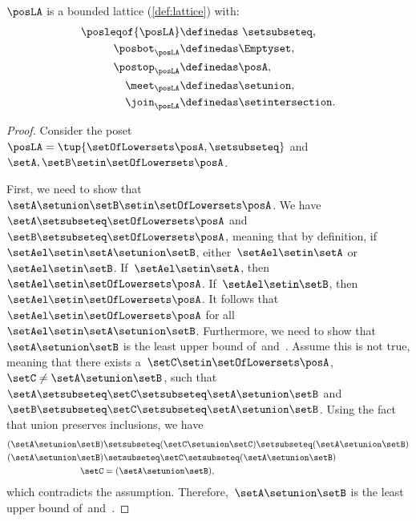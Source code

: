 \begin{lemma}
    $\posLA$ is a bounded lattice (\cref{def:lattice}) with:
    \begin{equation}
        \begin{aligned}
            \posleqof{\posLA} & \definedas \ \setsubseteq, \\
            \posbot_{\posLA}  & \definedas \Emptyset, \\
            \postop_{\posLA}  & \definedas \posA, \\
            \meet_{\posLA}    & \definedas \setunion, \\
            \join_{\posLA}    & \definedas \setintersection.
        \end{aligned}
    \end{equation}
\end{lemma}
\begin{proof}
    Consider the poset~$\posLA=\tup{\setOfLowersets \posA,\setsubseteq}$ and~$\setA,\setB\setin \setOfLowersets \posA$.

    First, we need to show that~$\setA\setunion \setB\setin \setOfLowersets \posA$.
    We have~$\setA \setsubseteq \setOfLowersets \posA$ and~$\setB\setsubseteq \setOfLowersets \posA$, meaning that by definition, if~$\setAel\setin \setA\setunion \setB$, either~$\setAel\setin \setA$ or~$\setAel\setin \setB$.
    If~$\setAel\setin \setA$, then~$\setAel\setin \setOfLowersets \posA$.
    If~$\setAel\setin \setB$, then~$\setAel\setin \setOfLowersets \posA$.
    It follows that~$\setAel\setin \setOfLowersets \posA$ for all~$\setAel\setin \setA\setunion \setB$.
    Furthermore, we need to show that~$\setA\setunion \setB$ is the least upper bound of~\setA and~\setB.
    Assume this is not true, meaning that there exists a~$\setC\setin \setOfLowersets \posA$,~$\setC\neq \setA\setunion \setB$, such that~$\setA\setsubseteq \setC\setsubseteq \setA\setunion \setB$ and~$\setB\setsubseteq \setC\setsubseteq \setA\setunion \setB$.
    Using the fact that union preserves inclusions, we have
    \begin{equation}
        \begin{aligned}
            (\setA\setunion \setB)
                                   & \setsubseteq (\setC\setunion \setC) \setsubseteq (\setA\setunion \setB) \\
            (\setA\setunion \setB) & \setsubseteq \setC \setsubseteq (\setA\setunion \setB) \\
            \setC                  & = (\setA\setunion \setB),
        \end{aligned}
    \end{equation}
    which contradicts the assumption.
    Therefore,~$\setA\setunion \setB$ is the least upper bound of~\setA and~\setB.


\end{proof}
